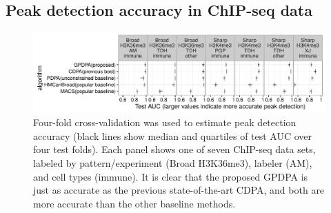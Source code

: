 \documentclass[aoas]{imsart}
\newcommand{\url}[1]{#1}
\begin{document}


\subsection{Peak detection accuracy in ChIP-seq data}


\begin{figure}[t!]
  \centering 
  \includegraphics[width=\textwidth]{figure-test-error-dots}
  \vskip -0.5cm
  \caption{Four-fold cross-validation was used to estimate peak
    detection accuracy (black lines show median and quartiles of test
    AUC over four test folds). Each panel shows one of seven ChIP-seq data
    sets, labeled by pattern/experiment (Broad H3K36me3), labeler
    (AM), and cell types (immune).  It is clear that the proposed
    GPDPA is just as accurate as the previous state-of-the-art CDPA,
    and both are more accurate than the other baseline methods.
  }
  \label{fig:test-error-dots}
\end{figure}
\end{document}
